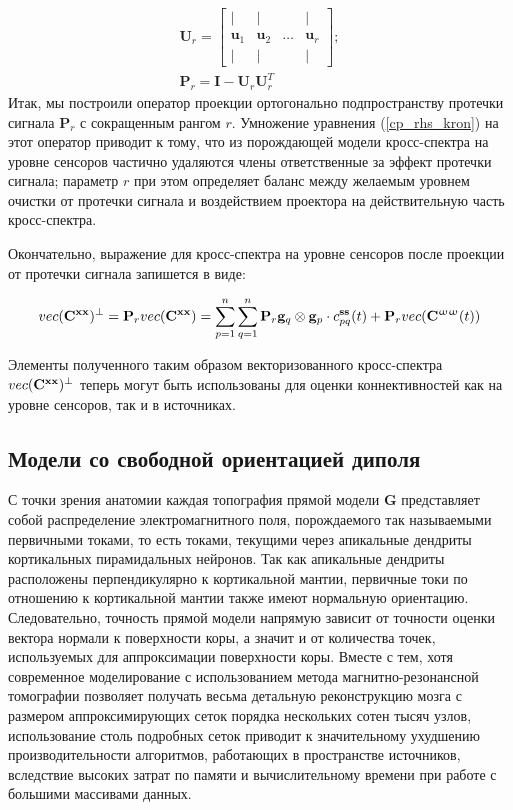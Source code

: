 \begin{gather}
    \mathbf{U}_r =
    \begin{bmatrix}
        |            & |            &        & |       \\
        \mathbf{u}_1 & \mathbf{u}_2 & \dots  & \mathbf{u}_r \\
        |            & |            &        & |
    \end{bmatrix};\\
    \mathbf{P}_r = \mathbf{I} - \mathbf{U}_r \mathbf{U}_r^T
 \end{gather}
Итак, мы построили оператор проекции ортогонально подпространству протечки сигнала $\mathbf{P}_r$
с сокращенным рангом $r$.
Умножение уравнения (\ref{cp_rhs_kron}) на этот оператор приводит к тому, что  из порождающей
модели кросс-спектра на уровне сенсоров частично удаляются члены ответственные за эффект протечки сигнала;
параметр $r$ при этом определяет баланс между желаемым уровнем очистки от протечки сигнала и
воздействием проектора на действительную часть кросс-спектра.

Окончательно, выражение для кросс-спектра на уровне сенсоров после проекции от протечки сигнала
запишется в виде:

\begin{equation}
    vec(\mathbf{C}^{\mathbf{x x}})^\perp = \mathbf{P}_r vec(\mathbf{C}^{\mathbf{x x}}) =  \sum\limits_{p=1}^n\sum\limits_{q=1}^n \mathbf{P}_r \mathbf{g}_q\otimes \mathbf{g}_p \cdot c_{pq}^{\mathbf{ss}}(t) + \mathbf{P}_r vec(\mathbf{C}^{\mathbf{\upomega \upomega}}(t))
    \label{cp_final}
\end{equation}

Элементы полученного таким образом векторизованного кросс-спектра $vec(\mathbf{C}^{\mathbf{x x}})^\perp$ теперь могут быть
использованы для оценки коннективностей как на уровне сенсоров, так и в источниках.

\subsection{Модели со свободной ориентацией диполя}
С точки зрения анатомии каждая топография прямой модели $\mathbf{G}$
представляет собой распределение электромагнитного поля,
порождаемого так называемыми первичными токами, то есть токами,
текущими через апикальные дендриты кортикальных пирамидальных нейронов.
Так как апикальные дендриты расположены перпендикулярно к кортикальной мантии,
первичные токи по отношению к кортикальной мантии также имеют нормальную ориентацию.
Следовательно, точность прямой модели напрямую зависит от точности оценки вектора нормали
к поверхности коры, а значит и от количества точек, используемых для аппроксимации поверхности коры.
Вместе с тем, хотя современное моделирование с использованием метода магнитно-резонансной
томографии позволяет получать весьма детальную реконструкцию мозга с размером аппроксимирующих сеток
порядка нескольких сотен тысяч узлов, использование столь подробных сеток приводит к значительному
ухудшению производительности алгоритмов, работающих в пространстве источников, вследствие высоких затрат
по памяти и вычислительному времени при работе с большими массивами данных.

